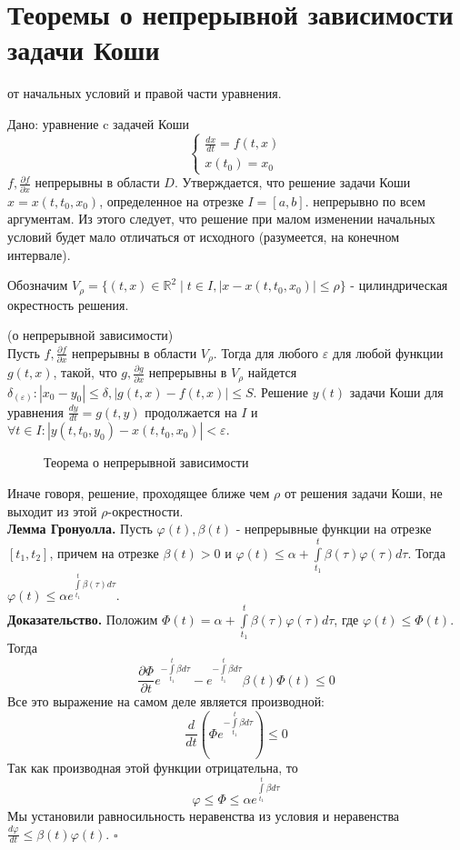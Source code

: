 \section{Теоремы о непрерывной зависимости задачи Коши}
от начальных условий и правой части уравнения.

Дано: уравнение c задачей Коши
$$\begin{cases}
    \frac{dx}{dt}=f(t,x)\\
    x(t_0)=x_0
\end{cases}$$ 
$f,\frac{\partial f}{\partial x}$  непрерывны в области $D$. 
Утверждается, что решение задачи Коши $x=x(t,t_0,x_0)$, определенное на 
отрезке $I=[a,b]$. 
непрерывно по всем 
аргументам. Из этого следует, что решение при малом изменении начальных 
условий будет мало отличаться от исходного (разумеется, на конечном
интервале). 

Обозначим $V_\rho=\{(t,x)\in \mathbb{R}^2\mid t\in I,|x-x(t,t_0,x_0)|
\leqslant \rho\}$ - цилиндрическая окрестность решения. 

\begin{theor}
    (о непрерывной зависимости)\\
    Пусть $f,\frac{\partial f}{\partial x}$  непрерывны в области $V_\rho$.
    Тогда для любого $\varepsilon$ для любой функции $g(t,x)$, такой, что
$g,\frac{\partial g}{\partial x}$ непрерывны в $V_\rho$ найдется
 $\delta_(\varepsilon):|x_0-y_0|\leqslant \delta,|g(t,x)-f(t,x)|\leqslant S$.
 Решение $y(t)$ задачи Коши для уравнения $\frac{dy}{dt}=g(t,y)$ продолжается
 на $I$ и  $\forall t\in I: |y(t,t_0,y_0)-x(t,t_0,x_0)|<\varepsilon$.
\end{theor}
\begin{figure}[H]
    \centering
    
    \caption{Теорема о непрерывной зависимости}
    \label{fig:}
\end{figure}
Иначе говоря, решение, проходящее ближе чем $\rho$ от решения задачи Коши,
не выходит из этой $\rho$-окрестности.\\
\textbf{Лемма Гронуолла.} Пусть $\varphi(t),\beta(t)$ - непрерывные функции
на отрезке $[t_1,t_2]$, причем на отрезке $\beta(t)>0$ и  $\varphi(t)\leqslant 
\alpha+\int\limits_{t_1}^{t} \beta(\tau)\varphi(\tau)d\tau$. 
Тогда 
$\varphi(t)\leqslant \alpha e^{\int\limits_{t_1}^{t}\beta(\tau)d\tau}$.\\
\textbf{Доказательство.} Положим $\Phi(t)=\alpha+
\int\limits_{t_1}^{t} \beta(\tau)\varphi(\tau)d\tau$, где 
$\varphi(t)\leqslant \Phi(t)$. Тогда
$$\frac{\partial \Phi}{\partial t}e^{-\int\limits_{t_1}^{t}\beta d\tau}
-e^{-\int\limits_{t_1}^{t}\beta d\tau}\beta(t)\Phi(t)\leqslant 0$$ 
Все это выражение на самом деле является производной:
$$\frac{d}{dt}\left( \Phi e^{-\int\limits_{t_1}^{t}\beta d\tau} \right)
\leqslant 0$$ 
 Так как производная этой функции отрицательна, то 
$$\varphi \leqslant \Phi\leqslant \alpha
e^{\int\limits_{t_1}^{t}\beta d\tau}$$
Мы установили равносильность неравенства из условия и неравенства
$\frac{d\varphi}{dt}\leqslant \beta(t)\varphi(t)$. $\square$ 

